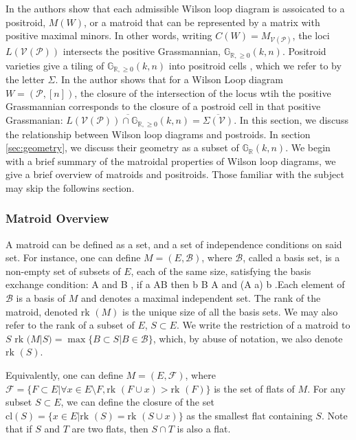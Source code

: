 \documentclass[11pt]{article}
\newcommand{\R}{\mathbb{R}}
\newcommand{\Gr}{\mathbb{G}_{\R, \geq 0}}
\newcommand{\Grall}{\mathbb{G}_{\R}}
\newcommand{\rk}{\textrm{rk }}
\def\bas #1\eas{\begin{align*} #1 \end{align*}}
\newcommand{\cP}{\mathcal{P}}
\newcommand{\cV}{\mathcal{V}}
\newcommand{\VP}{\cV(\cP)}
\newcommand{\cB}{\mathcal{B}}
\theoremstyle{remark}
\theoremstyle{definition}
\begin{document}
In \cite{wilsonloop} the authors show that each admissible Wilson loop diagram is assoicated to a positroid, $M(W)$, or a matroid that can be represented by a matrix with positive maximal minors. In other words, writing $C(W) = M_{\VP}$, the loci $L(\VP)$ intersects the positive Grassmannian, $\Gr(k,n)$. Positroid varieties give a tiling of $\Gr(k,n)$ into positroid cells \cite{??}, which we refer to by the letter $\Sigma$. In \cite[Theorem 8.4]{basisshapeloci} the author shows that for a Wilson Loop diagram $W = (\cP, [n])$, the closure of the intersection of the locus wtih the positive Grassmannian corresponds to the closure of a postroid cell in that positive Grassmanian: $\overline{L(\VP) \cap \Gr(k,n)} = \overline{\Sigma(\cV)}$. In this section, we discuss the relationship between Wilson loop diagrams and postroids. In section \ref{sec:geometry}, we discuss their geometry as a subset of $\Grall(k, n)$. We begin with a brief summary of the matroidal properties of Wilson loop diagrams, we give a brief overview of matroids and positroids. Those familiar with the subject may skip the followins section.

\subsubsection{\label{sec:matroidoverview} Matroid Overview} 

A matroid can be defined as a set, and a set of independence conditions on said set. For instance, one can define $M = (E, \mathcal{B})$, where $\mathcal{B}$, called a basis set, is a non-empty set of subsets of $E$, each of the same size, satisfying the basis exchange condition: \bas \textrm{for  all } A \textrm{ and } B \in \cB, \textrm{ if }  a \in A\setminus B \textrm{ then } \exists b \in B \setminus A \textrm{ and } (A \setminus a) \cup b \in  \cB \;.\eas Each element of $$ is a basis of $M$ and denotes a maximal independent set. The rank of the matroid, denoted $\rk(M)$ is the unique size of all the basis sets. We may also refer to the rank of a subset of $E$, $S \subset E$. We write the restriction of a matroid to $S$ $\rk(M|S) = \max \{B \subset S| B \in \mathcal{B} \}$, which, by abuse of notation, we also denote $\rk(S)$. 

Equivalently, one can define $M = (E, \mathcal{F})$, where $\mathcal{F} = \{ F \subset E| \forall x \in E \setminus F, \rk(F \cup x) > \rk(F)\}$ is the set of flats of $M$. For any subset $S \subset E$, we can define the closure of the set $\textrm{cl}(S)  = \{x \in E | \rk(S) = \rk(S \cup x)\}$ as the smallest flat containing $S$. Note that if $S$ and $T$ are two flats, then $S \cap T$ is also a flat. 
\end{document}
